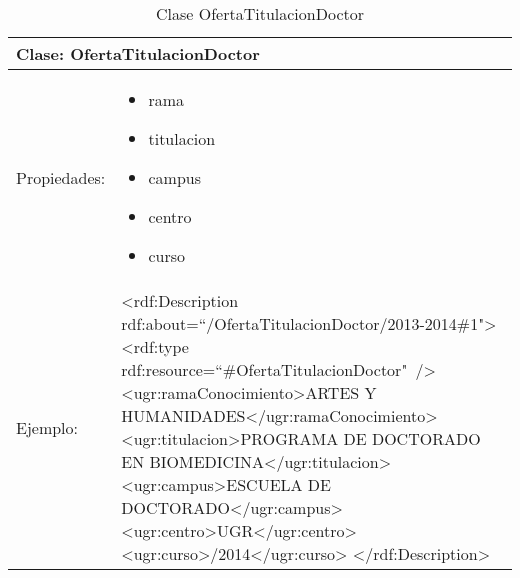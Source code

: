 \begin{table}[!ht]
	\centering
	\begin{tabular}{|p{}|p{}|}
		\hline
		\multicolumn{2}{|l|}{Clase: \textbf{OfertaTitulacionDoctor}}
		\\ \hline
		Propiedades:&
		\begin{itemize}
			\item rama
			\item titulacion
			\item campus
			\item centro
			\item curso
		\end{itemize}
		\\ \hline
		Ejemplo:&
		\textless rdf:Description \newline\tab rdf:about=``/OfertaTitulacionDoctor/2013-2014\#1"\textgreater \newline
		\tab \textless rdf:type rdf:resource=``\#OfertaTitulacionDoctor"\ /\textgreater 
		\newline \tab \textless ugr:ramaConocimiento\textgreater \newline\tab\tab ARTES Y HUMANIDADES\newline\tab\textless /ugr:ramaConocimiento\textgreater 
		\newline\tab \textless ugr:titulacion\textgreater \newline\tab\tab PROGRAMA DE DOCTORADO EN BIOMEDICINA\newline\tab \textless/ugr:titulacion\textgreater 
		\newline\tab \textless ugr:campus\textgreater \newline\tab\tab ESCUELA DE DOCTORADO\newline\tab\textless /ugr:campus\textgreater 
		\newline\tab \textless ugr:centro\textgreater \newline\tab\tab UGR\newline\tab\textless /ugr:centro\textgreater 
		\newline\tab \textless ugr:curso\textgreater \newline\tab\tab 2013/2014\newline\tab\textless /ugr:curso\textgreater 
		\newline\textless /rdf:Description\textgreater 
		\\ \hline
	\end{tabular}
	\caption{Clase OfertaTitulacionDoctor}
	\label{clase-ofertatitulaciondoctor}
\end{table}

